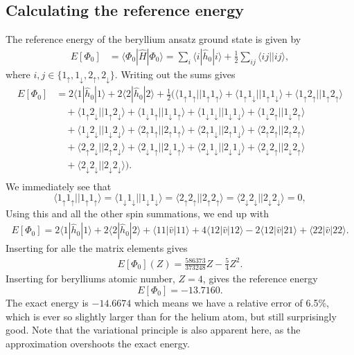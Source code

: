 \documentclass[a4paper, 11pt, notitlepage, english]{article}
\newcommand{\brakket}[2]{\langle #1 || #2 \rangle}
\newcommand{\op}[1]{\hat{#1}}
\newcommand{\braopket}[3]{\langle #1 | {#2} | #3 \rangle}
\renewcommand{\d}{{\rm d}}
\renewcommand{\u}{\uparrow}
\renewcommand{\d}{\downarrow}
\begin{document}
\subsection*{Calculating the reference energy}
The reference energy of the beryllium ansatz ground state is given by
\begin{align*}
E[\Phi_0] &= \braopket{\Phi_0}{\op{H}}{\Phi_0} = \sum_{i}\braopket{i}{\op{h}_0}{i} + \frac{1}{2}\sum_{ij} \brakket{ij}{ij},
\end{align*}
where $i,j\in\{1_\u,1_\d,2_\u,2_\d\}$. Writing out the sums gives
\begin{align*}
E[\Phi_0] &= 2\braopket{1}{\op{h}_0}{1} + 2\braopket{2}{\op{h}_0}{2} + \frac{1}{2}\big(
\brakket{1_\u 1_\u}{1_\u 1_\u} + \brakket{1_\u 1_\d}{1_\u 1_\d} 
+ \brakket{1_\u 2_\u}{1_\u 2_\u} \\&\quad
+ \brakket{1_\u 2_\d}{1_\u 2_\d}  
+ \brakket{1_\d 1_\u}{1_\d 1_\u}  
+ \brakket{1_\d 1_\d}{1_\d 1_\d}  
+ \brakket{1_\d 2_\u}{1_\d 2_\u}  
\\&\quad
+ \brakket{1_\d 2_\d}{1_\d 2_\d}  
+ \brakket{2_\u 1_\u}{2_\u 1_\u}  
+ \brakket{2_\u 1_\d}{2_\u 1_\d}  
+ \brakket{2_\u 2_\u}{2_\u 2_\u}  
\\&\quad
+ \brakket{2_\u 2_\d}{2_\u 2_\d}  
+ \brakket{2_\d 1_\u}{2_\d 1_\u}  
+ \brakket{2_\d 1_\d}{2_\d 1_\d}  
+ \brakket{2_\d 2_\u}{2_\d 2_\u}  
\\&\quad
+ \brakket{2_\d 2_\d}{2_\d 2_\d}\big). \\[-0.8cm]
\end{align*}
We immediately see that
$$\brakket{1_\u 1_\u}{1_\u 1_\u} = \brakket{1_\d 1_\d}{1_\d 1_\d} = \brakket{2_\u 2_\u}{2_\u 2_\u} =  \brakket{2_\d 2_\d}{2_\d 2_\d} = 0,$$
Using this and all the other spin summations, we end up with 
\begin{align*}
E[\Phi_0] = 2\braopket{1}{\op{h}_0}{1} + 2\braopket{2}{\op{h}_0}{2} + 
\braopket{11}{\op{v}}{11} + 4\braopket{12}{\op{v}}{12} - 2\braopket{12}{\op{v}}{21} + \braopket{22}{\op{v}}{22}.
\end{align*}
Inserting for alle the matrix elements gives
\begin{align*}
E[\Phi_0](Z) = \frac{586373}{373248}Z - \frac{5}{4}Z^2.
\end{align*}
Inserting for berylliums atomic number, $Z=4$, gives the reference energy
$$E[\Phi_0] = -13.7160.$$
The exact energy is $-14.6674$ which means we have a relative error of 6.5\%, which is ever so slightly larger than for the helium atom, but still surprisingly good. Note that the variational principle is also apparent here, as the approximation overshoots the exact energy.
\end{document}
